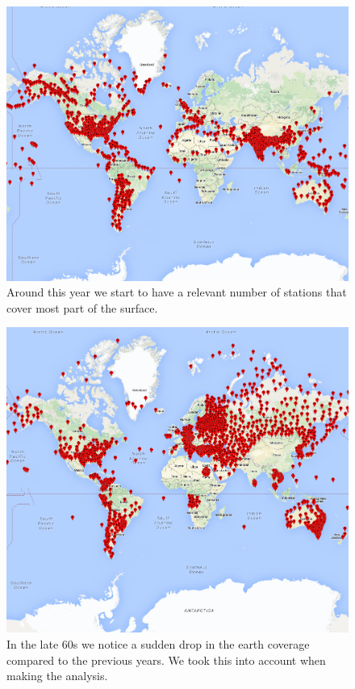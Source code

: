 \documentclass{vldb}
\begin{document}
\begin{figure}[tbh]
\includegraphics[width=1\linewidth]{stations1945}
\caption{Around this year we start to have a relevant number of stations that cover most part of the surface.}
\label{fig:stations1945}
\end{figure}

\begin{figure}[tbh]
\includegraphics[width=1\linewidth]{stations1968}
\caption{In the late 60s we notice a sudden drop in the earth coverage compared to the previous years. We took this into account when making the analysis.}
\label{fig:stations1968}
\end{figure}
\end{document}
